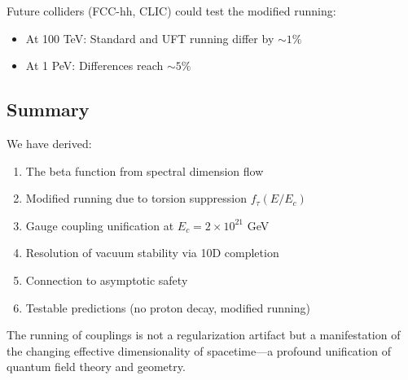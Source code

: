 Future colliders (FCC-hh, CLIC) could test the modified running:
\begin{itemize}
    \item At 100 TeV: Standard and UFT running differ by $\sim 1\%$
    \item At 1 PeV: Differences reach $\sim 5\%$
\end{itemize}

\subsection{Summary}

We have derived:
\begin{enumerate}
    \item The beta function from spectral dimension flow
    \item Modified running due to torsion suppression $f_\tau(E/E_c)$
    \item Gauge coupling unification at $E_c = 2 \times 10^{21}$ GeV
    \item Resolution of vacuum stability via 10D completion
    \item Connection to asymptotic safety
    \item Testable predictions (no proton decay, modified running)
\end{enumerate}

The running of couplings is not a regularization artifact but a manifestation of the changing effective dimensionality of spacetime—a profound unification of quantum field theory and geometry.

